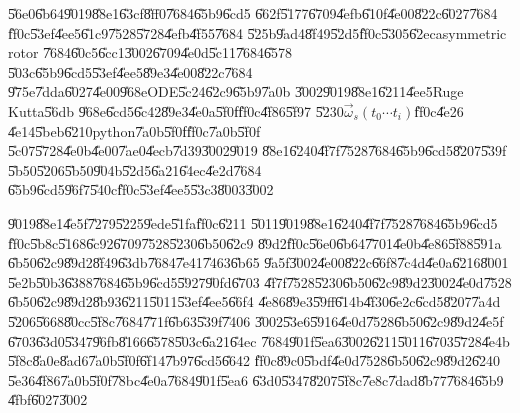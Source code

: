 \documentclass[12pt,a4paper]{article}
\begin{document}
\U{56e0}\U{6b64}\U{9019}\U{88e1}\U{63cf}\U{8ff0}\U{7684}\U{65b9}\U{6cd5}%
\U{662f}\U{5177}\U{6709}\U{4efb}\U{610f}\U{4e00}\U{822c}\U{6027}\U{7684}%
\U{ff0c}\U{53ef}\U{4ee5}\U{61c9}\U{7528}\U{5728}\U{4efb}\U{4f55}\U{7684}%
\U{525b}\U{9ad4}\U{8f49}\U{52d5}\U{ff0c}\U{5305}\U{62ec}asymmetric rotor%
\U{7684}\U{60c5}\U{6cc1}\U{3002}\U{6709}\U{4e0d}\U{5c11}\U{7684}\U{6578}%
\U{503c}\U{65b9}\U{6cd5}\U{53ef}\U{4ee5}\U{89e3}\U{4e00}\U{822c}\U{7684}%
\U{975e}\U{7dda}\U{6027}\U{4e00}\U{968e}ODE\U{5c24}\U{62c9}\U{65b9}\U{7a0b}%
\cite{matlab}\U{3002}\U{9019}\U{88e1}\U{6211}\U{4ee5}Ruge Kutta\U{56db}%
\U{968e}\U{6cd5}\U{6c42}\U{89e3}\U{4e0a}\U{5f0f}\U{ff0c}\U{4f86}\U{5f97}%
\U{5230}$\vec{\omega}_{s}\left( t_{0}\cdots t_{i}\right) $\U{ff0c}\U{4e26}%
\U{4e14}\U{5beb}\U{6210}python\U{7a0b}\U{5f0f}\U{ff0c}\U{7a0b}\U{5f0f}%
\U{5c07}\U{5728}\U{4e0b}\U{4e00}\U{7ae0}\U{4ecb}\U{7d39}\U{3002}\U{9019}%
\U{88e1}\U{6240}\U{4f7f}\U{7528}\U{7684}\U{65b9}\U{6cd5}\U{8207}\U{539f}%
\U{5b50}\U{5206}\U{5b50}\U{904b}\U{52d5}\U{6a21}\U{64ec}\U{4e2d}\U{7684}%
\U{65b9}\U{6cd5}\U{96f7}\U{540c}\U{ff0c}\U{53ef}\U{4ee5}\U{53c3}\U{8003}\cite%
{rapaport}\U{3002}

\bigskip

\U{9019}\U{88e1}\U{4e5f}\U{7279}\U{5225}\U{9ede}\U{51fa}\U{ff0c}\U{6211}%
\U{5011}\U{9019}\U{88e1}\U{6240}\U{4f7f}\U{7528}\U{7684}\U{65b9}\U{6cd5}%
\U{ff0c}\U{5b8c}\U{5168}\U{6c92}\U{6709}\U{7528}\U{5230}\U{6b50}\U{62c9}%
\U{89d2}\U{ff0c}\U{56e0}\U{6b64}\U{7701}\U{4e0b}\U{4e86}\U{5f88}\U{591a}%
\U{6b50}\U{62c9}\U{89d2}\U{8f49}\U{63db}\U{7684}\U{7e41}\U{7463}\U{6b65}%
\U{9a5f}\U{3002}\U{4e00}\U{822c}\U{66f8}\U{7c4d}\U{4e0a}\U{6216}\U{8001}%
\U{5e2b}\U{50b3}\U{6388}\U{7684}\U{65b9}\U{6cd5}\U{5927}\U{90fd}\U{6703}%
\U{4f7f}\U{7528}\U{5230}\U{6b50}\U{62c9}\U{89d2}\U{3002}\U{4e0d}\U{7528}%
\U{6b50}\U{62c9}\U{89d2}\U{8b93}\U{6211}\U{5011}\U{53ef}\U{4ee5}\U{66f4}%
\U{4e86}\U{89e3}\U{59ff}\U{614b}\U{4f30}\U{6e2c}\U{6cd5}\U{8207}\U{7a4d}%
\U{5206}\U{5668}\U{80cc}\U{5f8c}\U{7684}\U{771f}\U{6b63}\U{539f}\U{7406}%
\U{3002}\U{53e6}\U{5916}\U{4e0d}\U{7528}\U{6b50}\U{62c9}\U{89d2}\U{4e5f}%
\U{6703}\U{63d0}\U{5347}\U{96fb}\U{8166}\U{6578}\U{503c}\U{6a21}\U{64ec}%
\U{7684}\U{901f}\U{5ea6}\U{3002}\U{6211}\U{5011}\U{6703}\U{5728}\U{4e4b}%
\U{5f8c}\U{8a0e}\U{8ad6}\U{7a0b}\U{5f0f}\U{6f14}\U{7b97}\U{6cd5}\U{6642}%
\U{ff0c}\U{89c0}\U{5bdf}\U{4e0d}\U{7528}\U{6b50}\U{62c9}\U{89d2}\U{6240}%
\U{5e36}\U{4f86}\U{7a0b}\U{5f0f}\U{78bc}\U{4e0a}\U{7684}\U{901f}\U{5ea6}%
\U{63d0}\U{5347}\U{8207}\U{5f8c}\U{7e8c}\U{7dad}\U{8b77}\U{7684}\U{65b9}%
\U{4fbf}\U{6027}\U{3002}
\end{document}
